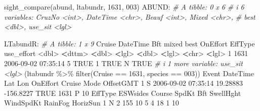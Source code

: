 \documentclass[
]{book}
\newenvironment{Shaded}{\begin{snugshade}}{\end{snugshade}}
\newcommand{\CommentTok}[1]{\textcolor[rgb]{0.56,0.35,0.01}{\textit{#1}}}
\newcommand{\ConstantTok}[1]{\textcolor[rgb]{0.00,0.00,0.00}{#1}}
\newcommand{\DecValTok}[1]{\textcolor[rgb]{0.00,0.00,0.81}{#1}}
\newcommand{\ErrorTok}[1]{\textcolor[rgb]{0.64,0.00,0.00}{\textbf{#1}}}
\newcommand{\FloatTok}[1]{\textcolor[rgb]{0.00,0.00,0.81}{#1}}
\newcommand{\FunctionTok}[1]{\textcolor[rgb]{0.00,0.00,0.00}{#1}}
\newcommand{\NormalTok}[1]{#1}
\newcommand{\SpecialCharTok}[1]{\textcolor[rgb]{0.00,0.00,0.00}{#1}}
\newcommand{\StringTok}[1]{\textcolor[rgb]{0.31,0.60,0.02}{#1}}
\begin{document}
\begin{Shaded}
\begin{Highlighting}[]
\FunctionTok{sight\_compare}\NormalTok{(abund, ltabundr, }\DecValTok{1631}\NormalTok{, }\StringTok{\textquotesingle{}003\textquotesingle{}}\NormalTok{)}
\NormalTok{ABUND}\SpecialCharTok{:}
\CommentTok{\# A tibble: 0 x 6}
\CommentTok{\# i 6 variables: CruzNo \textless{}int\textgreater{}, DateTime \textless{}chr\textgreater{}, Beauf \textless{}int\textgreater{}, Mixed \textless{}chr\textgreater{},}
\CommentTok{\#   best \textless{}dbl\textgreater{}, use\_sit \textless{}lgl\textgreater{}}

\NormalTok{LTabundR}\SpecialCharTok{:}
\CommentTok{\# A tibble: 1 x 9}
\NormalTok{  Cruise DateTime              Bft mixed  best OnEffort EffType use\_effort}
   \SpecialCharTok{\textless{}}\NormalTok{dbl}\SpecialCharTok{\textgreater{}} \ErrorTok{\textless{}}\NormalTok{dttm}\SpecialCharTok{\textgreater{}}              \ErrorTok{\textless{}}\NormalTok{dbl}\SpecialCharTok{\textgreater{}} \ErrorTok{\textless{}}\NormalTok{lgl}\SpecialCharTok{\textgreater{}} \ErrorTok{\textless{}}\NormalTok{dbl}\SpecialCharTok{\textgreater{}} \ErrorTok{\textless{}}\NormalTok{lgl}\SpecialCharTok{\textgreater{}}    \ErrorTok{\textless{}}\NormalTok{chr}\SpecialCharTok{\textgreater{}}   \ErrorTok{\textless{}}\NormalTok{lgl}\SpecialCharTok{\textgreater{}}     
\DecValTok{1}   \DecValTok{1631} \DecValTok{2006{-}09{-}02} \DecValTok{07}\SpecialCharTok{:}\DecValTok{35}\SpecialCharTok{:}\DecValTok{14}     \DecValTok{5} \ConstantTok{TRUE}      \DecValTok{1} \ConstantTok{TRUE}\NormalTok{     N       }\ConstantTok{TRUE}      
\CommentTok{\# i 1 more variable: use\_sit \textless{}lgl\textgreater{}}
\NormalTok{(ltabundr }\SpecialCharTok{\%\textgreater{}\%} \FunctionTok{filter}\NormalTok{(Cruise }\SpecialCharTok{==} \DecValTok{1631}\NormalTok{, species }\SpecialCharTok{==} \StringTok{\textquotesingle{}003\textquotesingle{}}\NormalTok{))}
\NormalTok{  Event            DateTime      Lat       Lon OnEffort Cruise Mode OffsetGMT}
\DecValTok{1}\NormalTok{     S }\DecValTok{2006{-}09{-}02} \DecValTok{07}\SpecialCharTok{:}\DecValTok{35}\SpecialCharTok{:}\DecValTok{14} \FloatTok{19.28883} \SpecialCharTok{{-}}\FloatTok{156.8227}     \ConstantTok{TRUE}   \DecValTok{1631}\NormalTok{    P        }\DecValTok{10}
\NormalTok{  EffType ESWsides Course SpdKt Bft SwellHght WindSpdKt RainFog HorizSun}
\DecValTok{1}\NormalTok{       N        }\DecValTok{2}    \DecValTok{155}    \DecValTok{10}   \DecValTok{5}         \DecValTok{4}        \DecValTok{18}       \DecValTok{1}       \DecValTok{10}

\end{Highlighting}
\end{Shaded}
\end{document}
